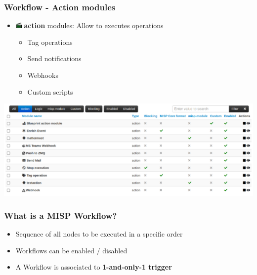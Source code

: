 \begin{frame}
    \frametitle{Workflow - Action modules}
    \begin{itemize}
        \item \includegraphics[width=12px]{pictures/sc-action-icon.png} \textbf{action} modules: Allow to executes operations
        \begin{itemize}
            \item Tag operations
            \item Send notifications
            \item Webhooks
            \item Custom scripts
        \end{itemize}
    \end{itemize}
    \begin{center}
        \includegraphics[width=1.0\linewidth]{pictures/action-module-index.png}
    \end{center}
\end{frame}

\begin{frame}
    \frametitle{What is a MISP Workflow?}
    \begin{itemize}
        \item Sequence of all nodes to be executed in a specific order
        \item Workflows can be enabled / disabled
        \item A Workflow is associated to \textbf{1-and-only-1 trigger}
    \end{itemize}
    \vspace*{0.5em}
    \begin{center}
    \end{center}
\end{frame}

